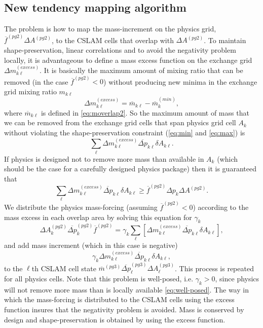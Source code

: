 \documentclass[draft,linenumbers]{agujournal}
\begin{document}
\subsection{New tendency mapping algorithm}\label{sec:massfix}
The problem is how to map the mass-increment on the physics grid, ${\overline{f}}^{(pg2)}\Delta A^{(pg2)}$, to the CSLAM cells that overlap with $\Delta A^{(pg2)}$. To maintain shape-preservation, linear correlations and to avoid the negativity problem locally, it is advantageous to define a mass excess function on the exchange grid $\Delta m_{k\ell}^{(excess)}$. It is basically the maximum amount of mixing ratio that can be removed (in the case ${\overline{f}}^{(pg2)}<0$) without producing new minima in the exchange grid mixing ratio $m_{k\ell}$
\begin{equation}
\Delta m^{(excess)}_{k\ell}=\overline{m}_{k\ell}-\overline{m}_k^{(min)},
\end{equation}
where $\overline{m}_{k\ell}$ is defined in \eqref{eq:moverlap2}. So the maximum amount of mass that we can be removed from the exchange grid cells that span physics grid cell $A_k$ without violating the shape-preservation constraint (\eqref{eq:min} and \eqref{eq:max}) is
\begin{equation}
\sum_\ell \Delta m^{(excess)}_{k\ell}\overline{\Delta p}_{k\ell} \delta A_{k\ell}.
\end{equation}
If physics is designed not to remove more mass than available in $A_k$ (which should be the case for a carefully designed physics package) then it is guaranteed that
\begin{equation}
\label{eq:well-posed}
\sum_\ell \Delta m^{(excess)}_{k\ell}\overline{\Delta p}_{k\ell} \delta A_{k\ell}\ge {\overline{f}}^{(pg2)}\Delta p_k\Delta A^{(pg2)}.
\end{equation}
We distribute the physics mass-forcing (assuming ${\overline{f}}^{(pg2)}<0$) according to the mass excess in each overlap area by solving this equation for $\gamma_k$
\begin{equation}
\label{eq:mass-excess}
\Delta A_k^{(pg2)}\overline{\Delta p}_k^{(pg2)}{\overline{f}}^{(pg2)}=\gamma_k \sum_\ell \left[ \Delta m^{(excess)}_{k\ell}\overline{\Delta p}_{k\ell} \delta A_{k\ell} \right],
\end{equation}
and add mass increment (which in this case is negative)
\begin{equation}
\label{eq:mass-incr}
\gamma_k \Delta m^{(excess)}_{k\ell}\overline{\Delta p}_{k\ell} \delta A_{k\ell},
\end{equation}
to the $\ell$th CSLAM cell state ${\overline{m}}^{(pg3)} \overline{\Delta p}^{(pg3)}_\ell \Delta A^{(pg3)}_\ell$. This process is repeated for all physics cells. Note that this problem is well-posed, i.e. $\gamma_k>0$, since physics will not remove more mass than is locally available \eqref{eq:well-posed}. The way in which the mass-forcing is distributed to the CSLAM cells using the excess function insures that the negativity problem is avoided. Mass is conserved by design and shape-preservation is obtained by using the excess function.
\end{document}
